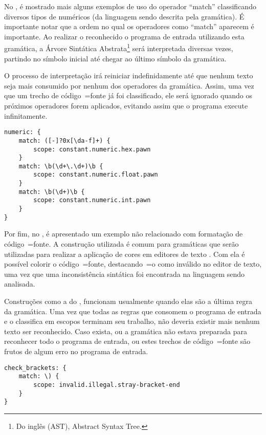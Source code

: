 No ,
é mostrado mais alguns exemplos de uso do operador ``match'' classificando diversos tipos de numéricos (da linguagem sendo descrita pela gramática).
É importante notar que a ordem no qual os operadores como ``match'' aparecem é importante.
Ao realizar o reconhecido o programa de entrada utilizando esta gramática,
a Árvore Sintática Abstrata\footnote{%
Do inglês (AST), Abstract Syntax Tree.
} \cite{ahoCompilerDragonBook} será interpretada diversas vezes,
partindo no símbolo inicial até chegar ao último símbolo da gramática.

O processo de interpretação irá reiniciar indefinidamente até que nenhum texto seja mais consumido por nenhum dos operadores da gramática.
Assim,
uma vez que um trecho de código~=fonte já foi classificado,
ele será ignorado quando os próximos operadores forem aplicados,
evitando assim que o programa execute infinitamente.
\begin{lstlisting}[caption={Exemplo de Gramática, Tipos numéricos},label={exemploDeGramaticaPawn4},style=yaml_style]
numeric: {
    match: ([-]?0x[\da-f]+) {
        scope: constant.numeric.hex.pawn
    }
    match: \b(\d+\.\d+)\b {
        scope: constant.numeric.float.pawn
    }
    match: \b(\d+)\b {
        scope: constant.numeric.int.pawn
    }
}
\end{lstlisting}

Por fim,
no ,
é apresentado um exemplo não relacionado com formatação de código~=fonte.
A construção utilizada é comum para gramáticas que serão utilizadas para realizar a aplicação de cores em editores de texto \cite{vsCodeSyntaxHighlighthing}.
Com ela é possível colorir o código~=fonte,
destacando~=o como inválido no editor de texto,
uma vez que uma inconsistência sintática foi encontrada na linguagem sendo analisada.

Construções como a do ,
funcionam usualmente quando elas são a última regra da gramática.
Uma vez que todas as regras que consomem o programa de entrada e
o classifica em escopos terminam seu trabalho,
não deveria existir mais nenhum texto ser reconhecido.
Caso exista,
ou a gramática não estava preparada para reconhecer todo o programa de entrada,
ou estes trechos de código~=fonte são frutos de algum erro no programa de entrada.
\begin{lstlisting}[caption={Exemplo de Gramática, Reconhecimento de Erros},label={exemploDeGramaticaPawn5},style=yaml_style]
check_brackets: {
    match: \) {
        scope: invalid.illegal.stray-bracket-end
    }
}
\end{lstlisting}


